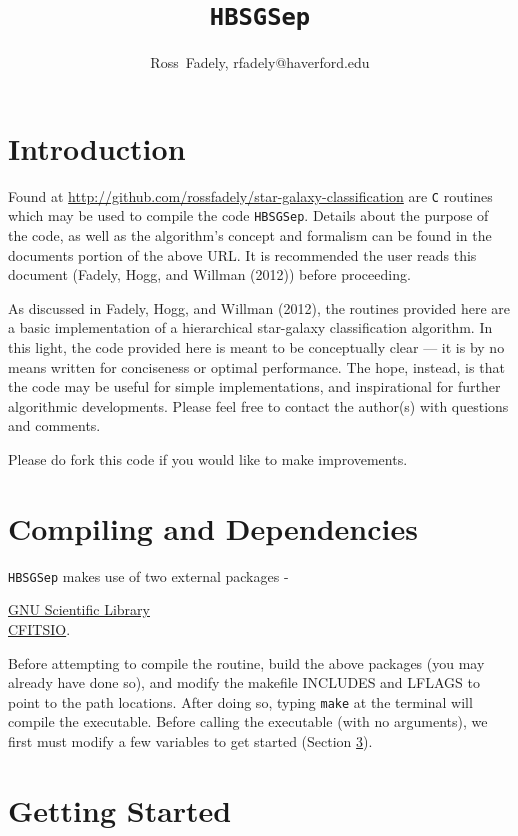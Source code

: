\documentclass[12pt,preprint]{aastex}
\newcommand{\tab}{\hspace*{2em}}
\begin{document}
\title{\tt HBSGSep} 

\author{Ross~Fadely, rfadely@haverford.edu}

\section{Introduction}

Found at \href{http://github.com/rossfadely/star-galaxy-classification}
{http://github.com/rossfadely/star-galaxy-classification} are {\tt C} routines 
which may be used to compile the code {\tt HBSGSep}.  Details about the purpose 
of the code, as well as the algorithm's concept and formalism can be found in 
the documents portion of the above URL.  It is recommended the user reads 
this document (Fadely, Hogg, and Willman (2012)) before proceeding.

As discussed in Fadely, Hogg, and Willman (2012), the routines provided here 
are a basic implementation of a hierarchical star-galaxy classification algorithm.  
In this light, the code provided here is meant to be conceptually clear --- it is 
by no means written for conciseness or optimal performance.  The hope, instead, 
is that the code may be useful for simple implementations, and inspirational for 
further algorithmic developments.  Please feel free to contact the author(s) with 
questions and comments.

Please do fork this code if you would like to make improvements.

\section{Compiling and Dependencies}

{\tt HBSGSep} makes use of two external packages - 

\tab\href{http://www.gnu.org/software/gsl/}{GNU Scientific Library} \\
\tab\href{http://heasarc.gsfc.nasa.gov/fitsio/}{CFITSIO}.

Before attempting to compile the routine, build the above packages (you may already 
have done so), and modify the makefile INCLUDES and LFLAGS to point to the path 
locations.  After doing so, typing {\tt make} at the terminal will compile the 
executable.  Before calling the executable (with no arguments), we first must modify 
a few variables to get started (Section \ref{sec:start}).

\section{Getting Started} 
\label{sec:start}
\end{document}
